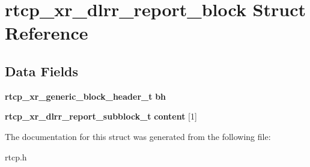 \section{rtcp\+\_\+xr\+\_\+dlrr\+\_\+report\+\_\+block Struct Reference}
\label{structrtcp__xr__dlrr__report__block}
\subsection*{Data Fields}
\begin{DoxyCompactItemize}
\item 
\mbox{\label{structrtcp__xr__dlrr__report__block_af63681d8e8c78aff05273efdbc2f0234}} 
\textbf{ rtcp\+\_\+xr\+\_\+generic\+\_\+block\+\_\+header\+\_\+t} {\bfseries bh}
\item 
\mbox{\label{structrtcp__xr__dlrr__report__block_a59ab49ce0f059b2c82e5394269043ef7}} 
\textbf{ rtcp\+\_\+xr\+\_\+dlrr\+\_\+report\+\_\+subblock\+\_\+t} {\bfseries content} [1]
\end{DoxyCompactItemize}


The documentation for this struct was generated from the following file\+:\begin{DoxyCompactItemize}
\item 
rtcp.\+h\end{DoxyCompactItemize}
